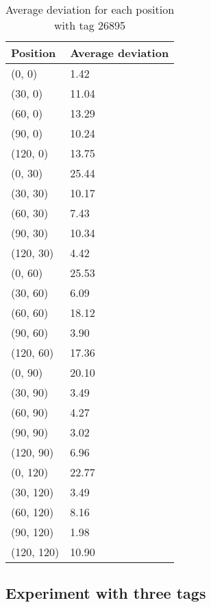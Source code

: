 \begin{table}[]
    \centering
    \begin{tabular}{|l|l|}
    \hline
    Position   & Average deviation \\ \hline
    (0, 0)     & 1.42              \\ \hline
    (30, 0)    & 11.04             \\ \hline
    (60, 0)    & 13.29             \\ \hline
    (90, 0)    & 10.24             \\ \hline
    (120, 0)   & 13.75             \\ \hline
    (0, 30)    & 25.44             \\ \hline
    (30, 30)   & 10.17             \\ \hline
    (60, 30)   & 7.43              \\ \hline
    (90, 30)   & 10.34             \\ \hline
    (120, 30)  & 4.42              \\ \hline
    (0, 60)    & 25.53             \\ \hline
    (30, 60)   & 6.09              \\ \hline
    (60, 60)   & 18.12             \\ \hline
    (90, 60)   & 3.90              \\ \hline
    (120, 60)  & 17.36             \\ \hline
    (0, 90)    & 20.10             \\ \hline
    (30, 90)   & 3.49              \\ \hline
    (60, 90)   & 4.27              \\ \hline
    (90, 90)   & 3.02              \\ \hline
    (120, 90)  & 6.96              \\ \hline
    (0, 120)   & 22.77             \\ \hline
    (30, 120)  & 3.49              \\ \hline
    (60, 120)  & 8.16              \\ \hline
    (90, 120)  & 1.98              \\ \hline
    (120, 120) & 10.90             \\ \hline
    \end{tabular}
    \caption{Average deviation for each position with tag 26895}
\end{table}

\subsection{Experiment with three tags}
